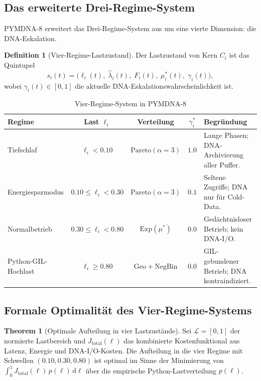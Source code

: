 ﻿\documentclass[a4paper,12pt]{article}
\theoremstyle{definition}
\newtheorem{definition}{Definition}[section]
\newtheorem{theorem}{Theorem}[section]
\newcommand{\Exp}{\mathrm{Exp}}
\newcommand{\Geo}{\mathrm{Geo}}
\newcommand{\NBin}{\mathrm{NegBin}}
\newcommand{\Pareto}{\mathrm{Pareto}}
\begin{document}
\subsection{Das erweiterte Drei-Regime-System}

PYMDNA-8 erweitert das Drei-Regime-System aus \cite{epp2026pymca8} um eine
vierte Dimension: die DNA-Eskalation.

\begin{definition}[Vier-Regime-Lastzustand]
  \label{def:vier_regime}
  Der Lastzustand von Kern $C_i$ ist das Quintupel
  \[
    s_i(t) = \bigl(\ell_i(t),\; \hat\lambda_i(t),\; F_i(t),\; \mu_i^*(t),\;
    \gamma_i(t)\bigr),
  \]
  wobei $\gamma_i(t) \in [0,1]$ die aktuelle DNA-Eskalationswahrscheinlichkeit ist.
\end{definition}

\begin{table}[H]
  \centering
  \caption{Vier-Regime-System in PYMDNA-8}
  \label{tab:vier_regime}
  \renewcommand{\arraystretch}{1.4}
  \begin{tabular}{lcccp{3.5cm}}
    \toprule
    \textbf{Regime} & \textbf{Last $\ell_i$} & \textbf{Verteilung}
    & \textbf{$\gamma_i^*$} & \textbf{Begründung} \\
    \midrule
    Tiefschlaf & $\ell_i < 0.10$ & $\Pareto(\alpha=3)$ & $1.0$
    & Lange Phasen; DNA-Archivierung aller Puffer. \\
    Energiesparmodus & $0.10 \le \ell_i < 0.30$ & $\Pareto(\alpha=3)$ & $0.1$
    & Seltene Zugriffe; DNA nur für Cold-Data. \\
    Normalbetrieb & $0.30 \le \ell_i < 0.80$ & $\Exp(\mu^*)$ & $0.0$
    & Gedächtnisloser Betrieb; kein DNA-I/O. \\
    Python-GIL-Hochlast & $\ell_i \ge 0.80$ & $\Geo + \NBin$ & $0.0$
    & GIL-gebundener Betrieb; DNA kontraindiziert. \\
    \bottomrule
  \end{tabular}
\end{table}

\subsection{Formale Optimalität des Vier-Regime-Systems}

\begin{theorem}[Optimale Aufteilung in vier Lastzustände]
  \label{thm:vier_regime_optimal}
  Sei $\mathcal{L} = [0,1]$ der normierte Lastbereich und
  $J_{\mathrm{total}}(\ell)$ das kombinierte Kostenfunktional aus
  Latenz, Energie und DNA-I/O-Kosten. Die Aufteilung in die vier Regime
  mit Schwellen $(0.10, 0.30, 0.80)$ ist optimal im Sinne der Minimierung
  von $\int_0^1 J_{\mathrm{total}}(\ell)\,p(\ell)\,\mathrm{d}\ell$ über
  die empirische Python-Lastverteilung $p(\ell)$.
\end{theorem}
\end{document}
